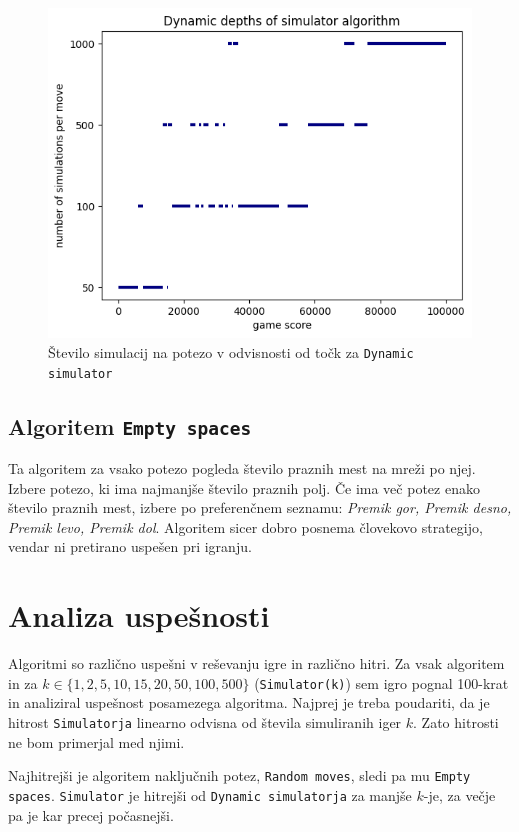 \documentclass{article}
\begin{document}
\begin{figure}[ht!]
\centering
\includegraphics[width=12cm]{dynamic_sim.png}
\caption{Število simulacij na potezo v odvisnosti od točk za \texttt{Dynamic simulator}}
\label{dynsim}
\end{figure}

\subsection{Algoritem \texttt{Empty spaces}}

Ta algoritem za vsako potezo pogleda število praznih mest na mreži po njej. Izbere potezo, ki ima najmanjše število praznih polj. Če ima več potez enako število praznih mest, izbere po preferenčnem seznamu: \textit{Premik gor, Premik desno, Premik levo, Premik dol}. Algoritem sicer dobro posnema človekovo strategijo, vendar ni pretirano uspešen pri igranju.

\section{Analiza uspešnosti}

Algoritmi so različno uspešni v reševanju igre in različno hitri. Za vsak algoritem in za $k \in \{1,2,5,10,15,20,50,100,500\}$ (\texttt{Simulator(k)}) sem igro pognal 100-krat in analiziral uspešnost posamezega algoritma. Najprej je treba poudariti, da je hitrost \texttt{Simulatorja} linearno odvisna od števila simuliranih iger $k$. Zato hitrosti ne bom primerjal med njimi. 

Najhitrejši je algoritem naključnih potez, \texttt{Random moves}, sledi pa mu \texttt{Empty spaces}. \texttt{Simulator} je hitrejši od \texttt{Dynamic simulatorja} za manjše $k$-je, za večje pa je kar precej počasnejši.
\end{document}
